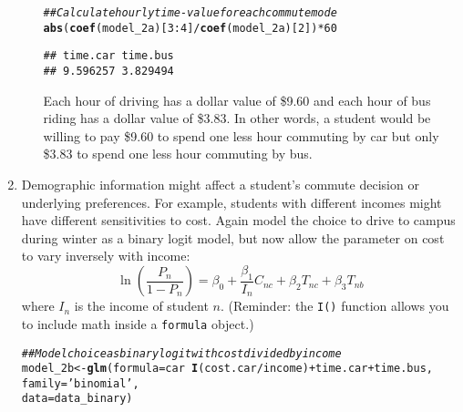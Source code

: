 \documentclass[11pt,letterpaper]{article}\usepackage[]{graphicx}\usepackage[]{color}
\makeatletter
\newcommand{\hlnum}[1]{\textcolor[rgb]{0.686,0.059,0.569}{#1}}%
\newcommand{\hlstr}[1]{\textcolor[rgb]{0.192,0.494,0.8}{#1}}%
\newcommand{\hlcom}[1]{\textcolor[rgb]{0.678,0.584,0.686}{\textit{#1}}}%
\newcommand{\hlopt}[1]{\textcolor[rgb]{0,0,0}{#1}}%
\newcommand{\hlstd}[1]{\textcolor[rgb]{0.345,0.345,0.345}{#1}}%
\newcommand{\hlkwb}[1]{\textcolor[rgb]{0.69,0.353,0.396}{#1}}%
\newcommand{\hlkwc}[1]{\textcolor[rgb]{0.333,0.667,0.333}{#1}}%
\newcommand{\hlkwd}[1]{\textcolor[rgb]{0.737,0.353,0.396}{\textbf{#1}}}%
\newenvironment{kframe}{%
 \def\at@end@of@kframe{}%
 \ifinner\ifhmode%
  \def\at@end@of@kframe{\end{minipage}}%
  \begin{minipage}{\columnwidth}%
 \fi\fi%
 \def\FrameCommand##1{\hskip\@totalleftmargin \hskip-\fboxsep
 \colorbox{shadecolor}{##1}\hskip-\fboxsep
     \hskip-\linewidth \hskip-\@totalleftmargin \hskip\columnwidth}%
 \MakeFramed {\advance\hsize-\width
   \@totalleftmargin\z@ \linewidth\hsize
   \@setminipage}}%
 {\par\unskip\endMakeFramed%
 \at@end@of@kframe}
\newenvironment{knitrout}{}{} %
\makeatother
\begin{document}
\begin{enumerate}[label=\alph*., leftmargin=*]
\begin{enumerate}[label=\roman*.]
\begin{knitrout}
\color{fgcolor}\begin{kframe}
\begin{alltt}
\hlcom{## Calculate hourly time-value for each commute mode}
\hlkwd{abs}\hlstd{(}\hlkwd{coef}\hlstd{(model_2a)[}\hlnum{3}\hlopt{:}\hlnum{4}\hlstd{]} \hlopt{/} \hlkwd{coef}\hlstd{(model_2a)[}\hlnum{2}\hlstd{])} \hlopt{*} \hlnum{60}
\end{alltt}
\begin{verbatim}
## time.car time.bus 
## 9.596257 3.829494
\end{verbatim}
\end{kframe}
\end{knitrout}

		Each hour of driving has a dollar value of \$9.60 and each hour of bus riding has a dollar value of \$3.83. In other words, a student would be willing to pay \$9.60 to spend one less hour commuting by car but only \$3.83 to spend one less hour commuting by bus.
	\end{enumerate}

	\item Demographic information might affect a student's commute decision or underlying preferences. For example, students with different incomes might have different sensitivities to cost. Again model the choice to drive to campus during winter as a binary logit model, but now allow the parameter on cost to vary inversely with income:
$$\ln \left( \frac{P_n}{1 - P_n} \right) = \beta_0 + \frac{\beta_1}{I_n} C_{nc} + \beta_2 T_{nc} + \beta_3 T_{nb}$$
where $I_n$ is the income of student $n$. (Reminder: the \texttt{I()} function allows you to include math inside a \texttt{formula} object.)

\begin{knitrout}
\color{fgcolor}\begin{kframe}
\begin{alltt}
\hlcom{## Model choice as binary logit with cost divided by income}
\hlstd{model_2b} \hlkwb{<-} \hlkwd{glm}\hlstd{(}\hlkwc{formula} \hlstd{= car} \hlopt{~} \hlkwd{I}\hlstd{(cost.car} \hlopt{/} \hlstd{income)} \hlopt{+} \hlstd{time.car} \hlopt{+} \hlstd{time.bus,}
                \hlkwc{family} \hlstd{=} \hlstr{'binomial'}\hlstd{,}
                \hlkwc{data} \hlstd{= data_binary)}
\end{alltt}
\end{kframe}
\end{knitrout}


\end{enumerate}
\end{document}

